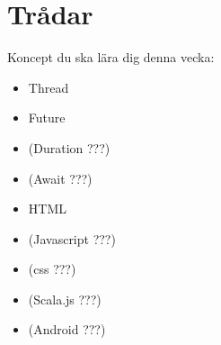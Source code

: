 \chapter{Trådar}\label{chapter:W12}
Koncept du ska lära dig denna vecka:
\begin{multicols}{2}\begin{itemize}[nosep,label={$\square$},leftmargin=*]
\item Thread
\item Future
\item (Duration ???)
\item (Await ???)
\item HTML
\item (Javascript ???)
\item (css ???)
\item (Scala.js ???)
\item (Android ???)\end{itemize}\end{multicols}
